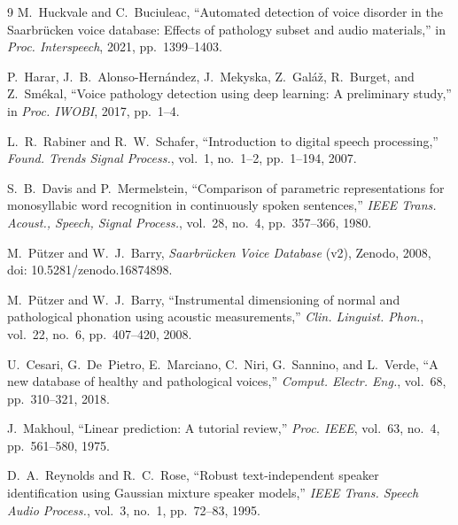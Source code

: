 \documentclass[conference]{IEEEtran}
\begin{document}
\begin{thebibliography}{9}
M.~Huckvale and C.~Buciuleac, ``Automated detection of voice disorder in the Saarbr\"ucken voice database: Effects of pathology subset and audio materials,'' in \emph{Proc. Interspeech}, 2021, pp.~1399--1403.

P.~Harar, J.~B.~Alonso-Hern\'andez, J.~Mekyska, Z.~Gal\'a\v{z}, R.~Burget, and Z.~Sm\'ekal, ``Voice pathology detection using deep learning: A preliminary study,'' in \emph{Proc. IWOBI}, 2017, pp.~1--4.

L.~R.~Rabiner and R.~W.~Schafer, ``Introduction to digital speech processing,'' \emph{Found. Trends Signal Process.}, vol.~1, no.~1--2, pp.~1--194, 2007.

S.~B.~Davis and P.~Mermelstein, ``Comparison of parametric representations for monosyllabic word recognition in continuously spoken sentences,'' \emph{IEEE Trans. Acoust., Speech, Signal Process.}, vol.~28, no.~4, pp.~357--366, 1980.

M.~P\"utzer and W.~J.~Barry, \emph{Saarbr\"ucken Voice Database} (v2), Zenodo, 2008, doi: 10.5281/zenodo.16874898.

M.~P\"utzer and W.~J.~Barry, ``Instrumental dimensioning of normal and pathological phonation using acoustic measurements,'' \emph{Clin. Linguist. Phon.}, vol.~22, no.~6, pp.~407--420, 2008.

U.~Cesari, G.~De~Pietro, E.~Marciano, C.~Niri, G.~Sannino, and L.~Verde, ``A new database of healthy and pathological voices,'' \emph{Comput. Electr. Eng.}, vol.~68, pp.~310--321, 2018.

J.~Makhoul, ``Linear prediction: A tutorial review,'' \emph{Proc. IEEE}, vol.~63, no.~4, pp.~561--580, 1975.

D.~A.~Reynolds and R.~C.~Rose, ``Robust text-independent speaker identification using Gaussian mixture speaker models,'' \emph{IEEE Trans. Speech Audio Process.}, vol.~3, no.~1, pp.~72--83, 1995.
\end{thebibliography}
\end{document}
